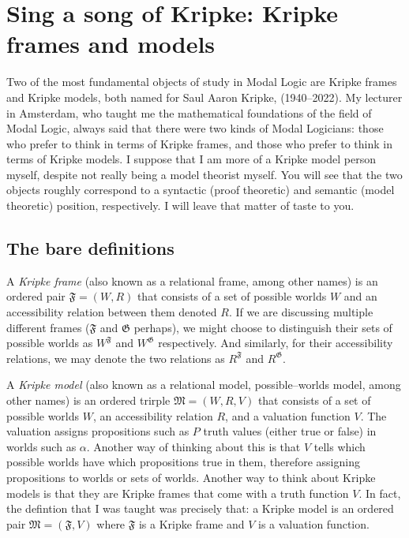 \chapter[Kripke frames and models]{Sing a song of Kripke: Kripke frames and models}

Two of the most fundamental objects of study in Modal Logic are Kripke frames and Kripke models, both named for Saul Aaron Kripke,
(1940--2022). My lecturer in Amsterdam, who taught me the mathematical foundations of the field of Modal Logic, always
said that there were two kinds of Modal Logicians: those who prefer to think in terms of Kripke frames, and those who prefer
to think in terms of Kripke models. I suppose that I am more of a Kripke model person myself, despite not really 
being a model theorist myself. You will see that the two objects roughly correspond to a syntactic (proof theoretic) and
semantic (model theoretic) position, respectively. I will leave that matter of taste to you.

\setcounter{section}{-1}

\section{The bare definitions}

A \emph{Kripke frame} (also known as a relational frame, among other names) is an ordered pair $\mathfrak{F} = (W, R)$ that consists of
a set of possible worlds $W$ and an accessibility relation between them denoted $R$. If we are discussing multiple different
frames ($\mathfrak{F}$ and $\mathfrak{G}$ perhaps), we might choose to distinguish their sets of possible worlds as $W^\mathfrak{F}$
and $W^\mathfrak{G}$ respectively. And similarly, for their accessibility relations, we may denote the two relations as
$R^{\mathfrak{F}}$ and $R^{\mathfrak{G}}$.

A \emph{Kripke model} (also known as a relational model, possible--worlds model, among other names) is an ordered trirple
$\mathfrak{M} = (W, R, V)$ that consists of a set of possible worlds $W$, an accessibility relation $R$, and a valuation function
$V$. The valuation assigns propositions such as $P$ truth values (either true or false) in worlds such as $\alpha$. Another way
of thinking about this is that $V$ tells which possible worlds have which propositions true in them, therefore assigning propositions
to worlds or sets of worlds. Another way to think about Kripke models is that they are Kripke frames that come with
a truth function $V$. In fact, the defintion that I was taught was precisely that: a Kripke model is an ordered pair $ \mathfrak{M}=
(\mathfrak{F}, V)$ where $\mathfrak{F}$ is a Kripke frame and $V$ is a valuation function.


